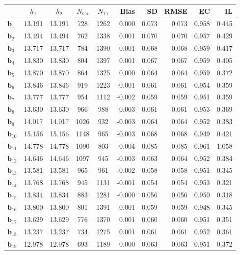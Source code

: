 \documentclass[10pt]{article}
\newcommand{\bb}{\mathbf{b}}
\begin{document}
\begin{table}[p]
    \centering
\begin{tabular}{lccccrrrrr}
\toprule\toprule
 & $h_1$ & $h_2$ & $N_{\mathrm{Co}}$ & $N_{\mathrm{Tr}}$ & Bias & SD & RMSE & EC & IL \\
\midrule
$\bb_{1}$ & 13.191 & 13.191 & 728 & 1262 & 0.000 & 0.073 & 0.073 & 0.958 & 0.445 \\
$\bb_{2}$ & 13.494 & 13.494 & 762 & 1338 & 0.001 & 0.070 & 0.070 & 0.957 & 0.429 \\
$\bb_{3}$ & 13.717 & 13.717 & 784 & 1390 & 0.001 & 0.068 & 0.068 & 0.959 & 0.417 \\
$\bb_{4}$ & 13.830 & 13.830 & 804 & 1397 & 0.001 & 0.067 & 0.067 & 0.959 & 0.405 \\
$\bb_{5}$ & 13.870 & 13.870 & 864 & 1325 & 0.000 & 0.064 & 0.064 & 0.959 & 0.372 \\
$\bb_{6}$ & 13.846 & 13.846 & 919 & 1223 & -0.001 & 0.061 & 0.061 & 0.954 & 0.359 \\
$\bb_{7}$ & 13.777 & 13.777 & 954 & 1112 & -0.002 & 0.059 & 0.059 & 0.951 & 0.359 \\
$\bb_{8}$ & 13.630 & 13.630 & 966 & 988 & -0.003 & 0.061 & 0.061 & 0.953 & 0.369 \\
$\bb_{9}$ & 14.017 & 14.017 & 1026 & 932 & -0.003 & 0.064 & 0.064 & 0.952 & 0.383 \\
$\bb_{10}$ & 15.156 & 15.156 & 1148 & 965 & -0.003 & 0.068 & 0.068 & 0.949 & 0.421 \\
$\bb_{11}$ & 14.778 & 14.778 & 1090 & 803 & -0.004 & 0.085 & 0.085 & 0.961 & 1.058 \\
$\bb_{12}$ & 14.646 & 14.646 & 1097 & 945 & -0.003 & 0.063 & 0.064 & 0.952 & 0.384 \\
$\bb_{13}$ & 13.581 & 13.581 & 965 & 961 & -0.002 & 0.058 & 0.058 & 0.951 & 0.345 \\
$\bb_{14}$ & 13.768 & 13.768 & 945 & 1131 & -0.001 & 0.054 & 0.054 & 0.953 & 0.321 \\
$\bb_{15}$ & 13.834 & 13.834 & 883 & 1281 & -0.000 & 0.056 & 0.056 & 0.950 & 0.318 \\
$\bb_{16}$ & 13.800 & 13.800 & 801 & 1391 & 0.001 & 0.059 & 0.059 & 0.948 & 0.345 \\
$\bb_{17}$ & 13.629 & 13.629 & 776 & 1370 & 0.001 & 0.060 & 0.060 & 0.951 & 0.351 \\
$\bb_{18}$ & 13.237 & 13.237 & 734 & 1275 & 0.001 & 0.061 & 0.061 & 0.952 & 0.361 \\
$\bb_{19}$ & 12.978 & 12.978 & 693 & 1189 & 0.000 & 0.063 & 0.063 & 0.951 & 0.372 \\

\end{tabular}
\end{table}
\end{document}
